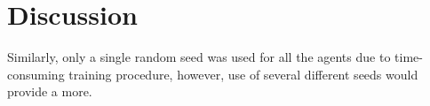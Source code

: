 \chapter{Discussion}\label{ch:discussion}

Similarly, only a single random seed was used for all the agents due to time-consuming training procedure, however, use of several different seeds would provide a more.
